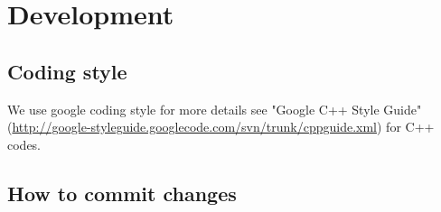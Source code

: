 \chapter{Development}

\section{Coding style}

We use google coding style for more details see "Google C++ Style Guide" (\url{http://google-styleguide.googlecode.com/svn/trunk/cppguide.xml}) for C++ codes.

\section{How to commit changes}

